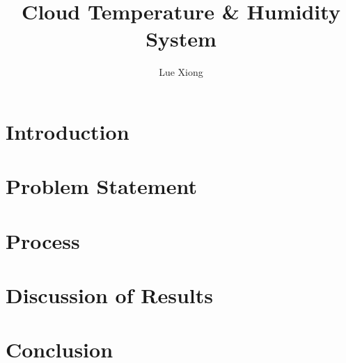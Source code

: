 \documentclass{article}
\title{Cloud Temperature \& Humidity System}
\author{Lue Xiong}
\begin{document}
\maketitle
\newpage

\tableofcontents
\newpage

\obeylines

\section{Introduction}

\section{Problem Statement}

\section{Process}

  


\section{Discussion of Results}

\section{Conclusion}
\end{document}
